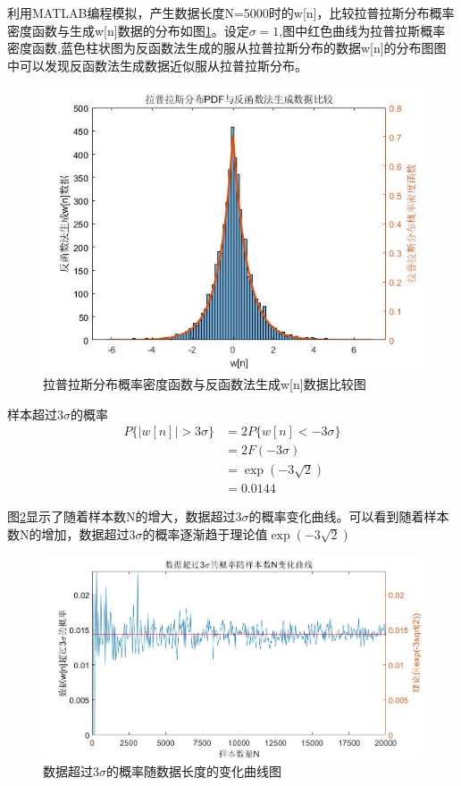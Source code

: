 \documentclass[fontset=windows]{article}
\numberwithin{figure}{section}
\begin{document}
利用MATLAB编程模拟，产生数据长度N=5000时的w[n]，比较拉普拉斯分布概率密度函数与生成w[n]数据的分布如图\ref*{fig:1}。设定\(\sigma=1\),图中红色曲线为拉普拉斯概率密度函数,蓝色柱状图为反函数法生成的服从拉普拉斯分布的数据w[n]的分布图图中可以发现反函数法生成数据近似服从拉普拉斯分布。

\begin{figure}[H]
    \centering
    \includegraphics[scale=0.5]{1.jpg}
    \caption{拉普拉斯分布概率密度函数与反函数法生成w[n]数据比较图}
    \label{fig:1}
\end{figure}

样本超过\(3\sigma\)的概率
\begin{align*}
    P\{\vert w[n]\vert >3\sigma\}
     & =2P\{w[n]<-3\sigma\} \\
     & =2F(-3\sigma)        \\
     & =\exp(-3\sqrt{2})    \\
     & =0.0144
\end{align*}

图\ref*{fig:2}显示了随着样本数N的增大，数据超过\(3\sigma\)的概率变化曲线。可以看到随着样本数N的增加，数据超过\(3\sigma\)的概率逐渐趋于理论值\(\exp(-3\sqrt{2})\)
\begin{figure}[H]
    \centering
    \includegraphics[scale=0.35]{2.jpg}
    \caption{数据超过\(3\sigma\)的概率随数据长度的变化曲线图}
    \label{fig:2}
\end{figure}
\end{document}
